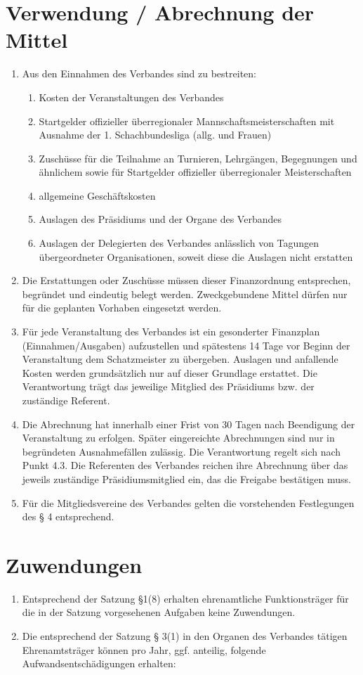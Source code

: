 \documentclass[fontsize=12pt, paper=a4, ngerman]{article}
\begin{document}
\section{Verwendung / Abrechnung der Mittel}
\begin{enumerate}
\item Aus den Einnahmen des Verbandes sind zu bestreiten:
  \begin{enumerate}[label=-]
  \item Kosten der Veranstaltungen des Verbandes
  \item Startgelder offizieller überregionaler Mannschaftsmeisterschaften mit Ausnahme der 1. Schachbundesliga (allg. und Frauen)
  \item Zuschüsse für die Teilnahme an Turnieren, Lehrgängen, Begegnungen und ähnlichem sowie für Startgelder
  offizieller überregionaler Meisterschaften
  \item allgemeine Geschäftskosten
  \item Auslagen des Präsidiums und der Organe des Verbandes
  \item Auslagen der Delegierten des Verbandes anlässlich von Tagungen übergeordneter Organisationen, soweit diese die Auslagen
  nicht erstatten
  \end{enumerate}
\item Die Erstattungen oder Zuschüsse müssen dieser Finanzordnung entsprechen, begründet
und eindeutig belegt werden. Zweckgebundene Mittel dürfen nur für die geplanten
Vorhaben eingesetzt werden.
\item Für jede Veranstaltung des Verbandes ist ein gesonderter Finanzplan
(Einnahmen/Ausgaben) aufzustellen und spätestens 14 Tage vor Beginn der Veranstaltung
dem Schatzmeister zu übergeben. Auslagen und anfallende Kosten werden grundsätzlich
nur auf dieser Grundlage erstattet. Die Verantwortung trägt das jeweilige Mitglied des
Präsidiums bzw. der zuständige Referent.
\item Die Abrechnung hat innerhalb einer Frist von 30 Tagen nach Beendigung der Veranstaltung
zu erfolgen. Später eingereichte Abrechnungen sind nur in begründeten Ausnahmefällen
zulässig. Die Verantwortung regelt sich nach Punkt 4.3. Die Referenten des Verbandes
reichen ihre Abrechnung über das jeweils zuständige Präsidiumsmitglied ein, das die Freigabe bestätigen muss.
\item Für die Mitgliedsvereine des Verbandes gelten die vorstehenden Festlegungen des § 4 entsprechend.
\end{enumerate}

\section{Zuwendungen}
\begin{enumerate}
\item Entsprechend der Satzung §1(8) erhalten ehrenamtliche Funktionsträger für die in der
Satzung vorgesehenen Aufgaben keine Zuwendungen.
\item Die entsprechend der Satzung § 3(1) in den Organen des Verbandes tätigen
Ehrenamtsträger können pro Jahr, ggf. anteilig, folgende Aufwandsentschädigungen
erhalten:
\end{enumerate}
\end{document}
